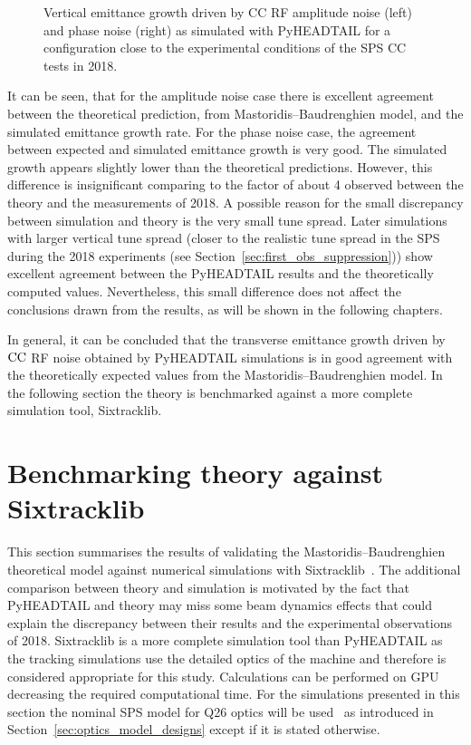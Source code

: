 \begin{figure}[htp]
\begin{subfigure}{.45\textwidth}
    \end{subfigure}
    \caption{Vertical emittance growth driven by CC RF amplitude noise (left) and phase noise (right) as simulated with PyHEADTAIL for a configuration close to the experimental conditions of the SPS CC tests in 2018.}
    \label{fig:study_pyheadtail_normalised_momentum_kicks}
\end{figure}

It can be seen, that for the amplitude noise case there is excellent agreement between the theoretical prediction, from Mastoridis--Baudrenghien model, and the simulated emittance growth rate. For the phase noise case, the agreement between expected and simulated emittance growth is very good. The simulated growth appears slightly lower than the theoretical predictions. However, this difference is insignificant comparing to the factor of about 4 observed between the theory and the measurements of 2018. A possible reason for the small discrepancy between simulation and theory is the very small tune spread. Later simulations with larger vertical tune spread (closer to the realistic tune spread in the SPS during the 2018 experiments (see Section~\ref{sec:first_obs_suppression})) show excellent agreement between the PyHEADTAIL results and the theoretically computed values. Nevertheless, this small difference does not affect the conclusions drawn from the results, as will be shown in the following chapters.

In general, it can be concluded that the transverse emittance growth driven by ${\mathrm{CC}}$ RF noise obtained by PyHEADTAIL simulations is in good agreement with the theoretically expected values from the Mastoridis--Baudrenghien model. In the following section the theory is benchmarked against a more complete simulation tool, Sixtracklib.


\section{Benchmarking theory against Sixtracklib}\label{sec:benchmark_theory_with_sixtracklib}
This section summarises the results of validating the Mastoridis--Baudrenghien theoretical model against numerical simulations with Sixtracklib~\cite{sixtracklib_repo}. The additional comparison between theory and simulation is motivated by the fact that PyHEADTAIL and theory may miss some beam dynamics effects that could explain the discrepancy between their results and the experimental observations of 2018. Sixtracklib is a more complete simulation tool than PyHEADTAIL as the tracking simulations use the detailed optics of the machine and therefore is considered appropriate for this study. Calculations can be performed on GPU decreasing the required computational time. For the simulations presented in this section the nominal SPS model for Q26 optics will be used~\cite{cern_optics_repo} as introduced in Section~\ref{sec:optics_model_designs} except if it is stated otherwise.

